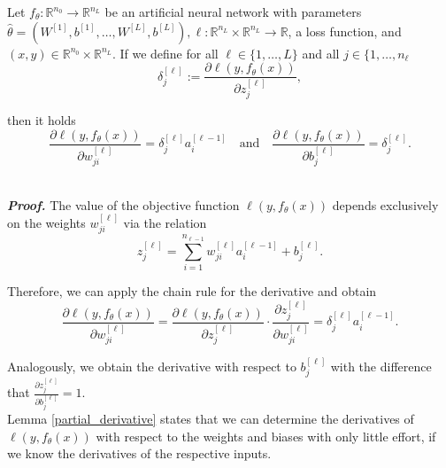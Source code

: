 \begin{lemma}\label{partial_derivative}
Let $f_{\theta}: \mathbb{R}^{n_0} \rightarrow \mathbb{R}^{n_L}$ be an artificial neural network with parameters $\hat{\theta} = (W^{[1]}, b^{[1]}, \ldots, W^{[L]}, b^{[L]}), \ell: \mathbb{R}^{n_L} \times \mathbb{R}^{n_L} \rightarrow \mathbb{R}$, a loss function, and $(x, y) \in \mathbb{R}^{n_0} \times \mathbb{R}^{n_L}$. If we define for all $\ell \in \{1, \ldots, L\}$ and all $j \in \{1, \ldots, n_{\ell}$
\begin{equation}
    \delta_j^{[\ell]} := \frac{\partial \ell (y, f_\theta (x))}{\partial z_j^{[\ell]}} ,
    \label{eqn:49}
\end{equation}

then it holds
\begin{equation}
    \frac{\partial \ell(y, f_\theta(x))}{\partial w_{ji}^{[\ell]}} = \delta_j^{[\ell]} a_i^{[\ell-1]}
    \quad \text{and} \quad
    \frac{\partial \ell(y, f_\theta(x))}{\partial b_j^{[\ell]}} = \delta_j^{[\ell]}.
    \label{eqn:50}
\end{equation}
\end{lemma}\\

\textbf{\emph{Proof.}} The value of the objective function $\ell(y, f_\theta(x))$ depends exclusively on the weights $w_{ji}^{[\ell]}$ via the relation
\begin{equation}
z_j^{[\ell]} = \sum_{i=1}^{n_{\ell-1}} w_{ji}^{[\ell]} a_i^{[\ell-1]} + b_j^{[\ell]}.
\label{eqn:51}
\end{equation}

Therefore, we can apply the chain rule for the derivative and obtain
\begin{equation}
\frac{\partial \ell(y, f_\theta(x))}{\partial w_{ji}^{[\ell]}} = \frac{\partial \ell(y, f_\theta(x))}{\partial z_j^{[\ell]}} \cdot \frac{\partial z_j^{[\ell]}}{\partial w_{ji}^{[\ell]}} = \delta_j^{[\ell]} a_i^{[\ell-1]}.
\label{eqn:52}
\end{equation}

Analogously, we obtain the derivative with respect to $b_j^{[\ell]}$ with the difference that $\frac{\partial z_j^{[\ell]}}{\partial b_j^{[\ell]}} = 1$.\\

Lemma \ref{partial_derivative} states that we can determine the derivatives of $\ell(y, f_{\theta}(x))$ with respect to the weights and biases with only little effort, if we know the derivatives of the respective inputs.

